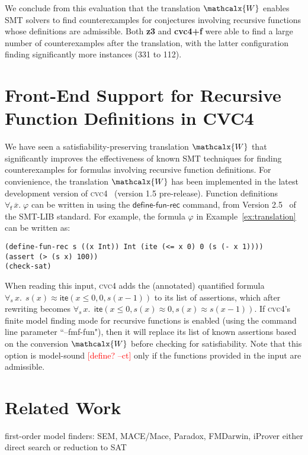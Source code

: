 \documentclass[runningheads,a4paper]{llncs}
\newcommand{\con}[1]{\mathsf{#1}}
\renewcommand\vec[1]{\overline{#1}}
\newcommand{\cvc}{\textsc{cvc}{\small 4}\xspace}
\newcommand{\teq}{\approx}
\newcommand{\conv}{\mathcalx{W}}
\newcommand{\lite}{\con{ite}}
\newcommand{\forallf}[1]{\forall_{\!#1\:}}
\newcommand{\rem}[1]{\textcolor{red}{[#1]}}
\newcommand{\ct}[1]{\rem{#1 --ct}}
\newcommand{\definefunreccmd}{\con{define}\text{-}\con{fun}\text{-}\con{rec}}
\begin{document}
We conclude from this evaluation that the translation $\conv$ enables SMT solvers to find counterexamples 
for conjectures involving recursive functions whose definitions are admissible.
Both {\bf z3} and {\bf cvc4+f} were able to find a large number of counterexamples after the translation,
with the latter configuration finding significantly more instances (331 to 112).

\section{Front-End Support for Recursive Function Definitions in CVC4}
\label{sec:front-end}

We have seen a satisfiability-preserving translation $\conv$ that significantly improves the effectiveness of known SMT techniques
for finding counterexamples for formulas involving recursive function definitions.
For convienience, the translation $\conv$ has been implemented in the latest development version of \cvc~\cite{ReyEtAl-1-RR-13} (version 1.5 pre-release).
Function definitions $\forallf{\con{f}} \vec x.\; \varphi$ can be written in using the $\definefunreccmd$ command, 
from Version 2.5~\cite{} of the SMT-LIB standard.
For example, the formula $\varphi$ in Example~\ref{ex:translation} 
can be written as:

{\small
\begin{verbatim}
(define-fun-rec s ((x Int)) Int (ite (<= x 0) 0 (s (- x 1))))
(assert (> (s x) 100))
(check-sat)
\end{verbatim}
}

When reading this input, 
\cvc adds the (annotated) quantified formula $\forallf{s} x.\;\, s( x ) \teq \lite( x \leq 0, 0, s( x-1 ) )$ to its list of assertions,
which after rewriting becomes $\forallf{s} x.\;\, \lite( x \leq 0, s( x ) \teq 0, s( x ) \teq s( x-1 ) )$.
If \cvc's finite model finding mode for recursive functions is enabled (using the command line parameter ``--fmf-fun"),
then it will replace its list of known assertions based on the conversion $\conv$ before checking for satisfiability.
Note that this option is model-sound \ct{define?} only if the functions provided in the input are admissible.

\section{Related Work}

first-order model finders: SEM, MACE/Mace, Paradox, FMDarwin, iProver
  either direct search or reduction to SAT
\end{document}
